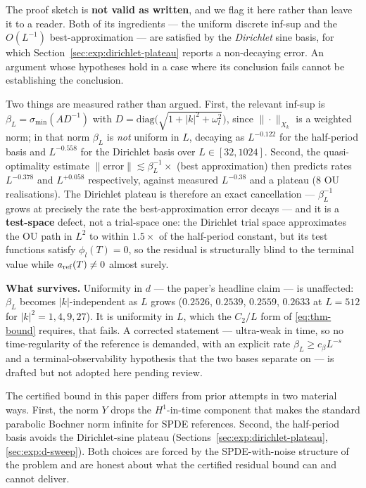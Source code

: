\begin{remark}
\label{rem:infsup-defect}
The proof sketch is \textbf{not valid as written}, and we flag it here rather
than leave it to a reader. Both of its ingredients --- the uniform discrete
inf-sup and the $O(L^{-1})$ best-approximation --- are satisfied by the
\emph{Dirichlet} sine basis, for which
Section~\ref{sec:exp:dirichlet-plateau} reports a non-decaying error. An
argument whose hypotheses hold in a case where its conclusion fails cannot be
establishing the conclusion.

Two things are measured rather than argued. First, the relevant inf-sup is
$\beta_L = \sigma_{\min}(A D^{-1})$ with
$D = \mathrm{diag}\bigl(\sqrt{1 + |k|^2 + \omega_l^2}\bigr)$, since
$\|\cdot\|_{X_k}$ is a weighted norm; in that norm $\beta_L$ is \emph{not}
uniform in $L$, decaying as $L^{-0.122}$ for the half-period basis and
$L^{-0.558}$ for the Dirichlet basis over $L \in [32, 1024]$. Second, the
quasi-optimality estimate $\|\text{error}\| \lesssim \beta_L^{-1} \times$
(best approximation) then predicts rates $L^{-0.378}$ and $L^{+0.058}$
respectively, against measured $L^{-0.38}$ and a plateau (8 OU realisations).
The Dirichlet plateau is therefore an exact cancellation --- $\beta_L^{-1}$
grows at precisely the rate the best-approximation error decays --- and it is a
\textbf{test-space} defect, not a trial-space one: the Dirichlet trial space
approximates the OU path in $L^2$ to within $1.5\times$ of the half-period
constant, but its test functions satisfy $\phi_l(T) = 0$, so the residual is
structurally blind to the terminal value while $a_{\rm ref}(T) \neq 0$ almost
surely.

\textbf{What survives.} Uniformity in $d$ --- the paper's headline claim --- is
unaffected: $\beta_L$ becomes $|k|$-independent as $L$ grows ($0.2526$,
$0.2539$, $0.2559$, $0.2633$ at $L = 512$ for $|k|^2 = 1, 4, 9, 27$). It is
uniformity in $L$, which the $C_2/L$ form of \eqref{eq:thm-bound} requires,
that fails. A corrected statement --- ultra-weak in time, so no time-regularity
of the reference is demanded, with an explicit rate $\beta_L \ge c_\beta L^{-s}$
and a terminal-observability hypothesis that the two bases separate on --- is
drafted but not adopted here pending review.
\end{remark}

\begin{remark}[Comparison to v1, v2]
The certified bound in this paper differs from prior attempts in two
material ways. First, the norm $Y$ drops the $H^1$-in-time component
that makes the standard parabolic Bochner norm infinite for SPDE
references. Second, the half-period basis avoids the Dirichlet-sine
plateau (Sections~\ref{sec:exp:dirichlet-plateau}, \ref{sec:exp:d-sweep}).
Both choices are forced by the SPDE-with-noise structure of the problem
and are honest about what the certified residual bound can and cannot
deliver.
\end{remark}

